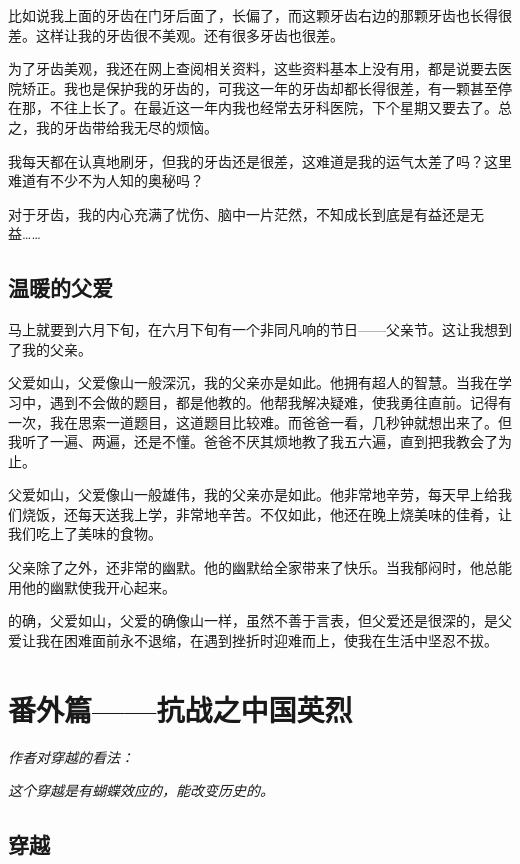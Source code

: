 \documentclass[UTF8,a4paper,titlepage,twoside,10.5pt]{article}
\begin{document}
比如说我上面的牙齿在门牙后面了，长偏了，而这颗牙齿右边的那颗牙齿也长得很差。这样让我的牙齿很不美观。还有很多牙齿也很差。

为了牙齿美观，我还在网上查阅相关资料，这些资料基本上没有用，都是说要去医院矫正。我也是保护我的牙齿的，可我这一年的牙齿却都长得很差，有一颗甚至停在那，不往上长了。在最近这一年内我也经常去牙科医院，下个星期又要去了。总之，我的牙齿带给我无尽的烦恼。

我每天都在认真地刷牙，但我的牙齿还是很差，这难道是我的运气太差了吗？这里难道有不少不为人知的奥秘吗？

对于牙齿，我的内心充满了忧伤、脑中一片茫然，不知成长到底是有益还是无益……

\subsection{温暖的父爱}
\label{sec:org4033064}

马上就要到六月下旬，在六月下旬有一个非同凡响的节日——父亲节。这让我想到了我的父亲。

父爱如山，父爱像山一般深沉，我的父亲亦是如此。他拥有超人的智慧。当我在学习中，遇到不会做的题目，都是他教的。他帮我解决疑难，使我勇往直前。记得有一次，我在思索一道题目，这道题目比较难。而爸爸一看，几秒钟就想出来了。但我听了一遍、两遍，还是不懂。爸爸不厌其烦地教了我五六遍，直到把我教会了为止。

父爱如山，父爱像山一般雄伟，我的父亲亦是如此。他非常地辛劳，每天早上给我们烧饭，还每天送我上学，非常地辛苦。不仅如此，他还在晚上烧美味的佳肴，让我们吃上了美味的食物。

父亲除了之外，还非常的幽默。他的幽默给全家带来了快乐。当我郁闷时，他总能用他的幽默使我开心起来。

的确，父爱如山，父爱的确像山一样，虽然不善于言表，但父爱还是很深的，是父爱让我在困难面前永不退缩，在遇到挫折时迎难而上，使我在生活中坚忍不拔。

\newpage

\section{番外篇——抗战之中国英烈}
\label{sec:orgeddec35}

\emph{作者对穿越的看法：}

\emph{这个穿越是有蝴蝶效应的，能改变历史的。}

\subsection{穿越}
\label{sec:org64e0d92}
\end{document}
